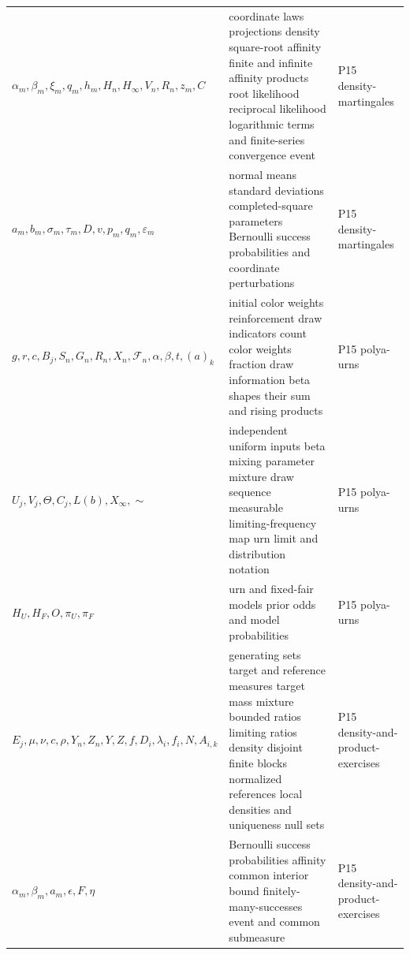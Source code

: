 \begin{longtable}{@{}p{}p{}p{}@{}}
\(\alpha_m,\allowbreak \beta_m,\allowbreak \xi_m,\allowbreak q_m,\allowbreak h_m,\allowbreak H_n,\allowbreak H_\infty,\allowbreak V_n,\allowbreak R_n,\allowbreak z_m,\allowbreak C\) & coordinate laws projections density square-root affinity finite and infinite affinity products root likelihood reciprocal likelihood logarithmic terms and finite-series convergence event & P15 density-\allowbreak{}martingales \\
\(a_m,\allowbreak b_m,\allowbreak \sigma_m,\allowbreak \tau_m,\allowbreak D,\allowbreak v,\allowbreak p_m,\allowbreak q_m,\allowbreak \varepsilon_m\) & normal means standard deviations completed-square parameters Bernoulli success probabilities and coordinate perturbations & P15 density-\allowbreak{}martingales \\
\(g,\allowbreak r,\allowbreak c,\allowbreak B_j,\allowbreak S_n,\allowbreak G_n,\allowbreak R_n,\allowbreak X_n,\allowbreak \mathcal F_n,\allowbreak \alpha,\allowbreak \beta,\allowbreak t,\allowbreak (a)_k\) & initial color weights reinforcement draw indicators count color weights fraction draw information beta shapes their sum and rising products & P15 polya-\allowbreak{}urns \\
\(U_j,\allowbreak V_j,\allowbreak \Theta,\allowbreak C_j,\allowbreak L(b),\allowbreak X_\infty,\allowbreak \sim\) & independent uniform inputs beta mixing parameter mixture draw sequence measurable limiting-frequency map urn limit and distribution notation & P15 polya-\allowbreak{}urns \\
\(H_U,\allowbreak H_F,\allowbreak O,\allowbreak \pi_U,\allowbreak \pi_F\) & urn and fixed-fair models prior odds and model probabilities & P15 polya-\allowbreak{}urns \\
\(E_j,\allowbreak \mu,\allowbreak \nu,\allowbreak c,\allowbreak \rho,\allowbreak Y_n,\allowbreak Z_n,\allowbreak Y,\allowbreak Z,\allowbreak f,\allowbreak D_i,\allowbreak \lambda_i,\allowbreak f_i,\allowbreak N,\allowbreak A_{i,k}\) & generating sets target and reference measures target mass mixture bounded ratios limiting ratios density disjoint finite blocks normalized references local densities and uniqueness null sets & P15 density-\allowbreak{}and-\allowbreak{}product-\allowbreak{}exercises \\
\(\alpha_m,\allowbreak \beta_m,\allowbreak a_m,\allowbreak \epsilon,\allowbreak F,\allowbreak \eta\) & Bernoulli success probabilities affinity common interior bound finitely-many-successes event and common submeasure & P15 density-\allowbreak{}and-\allowbreak{}product-\allowbreak{}exercises \\

\end{longtable}
